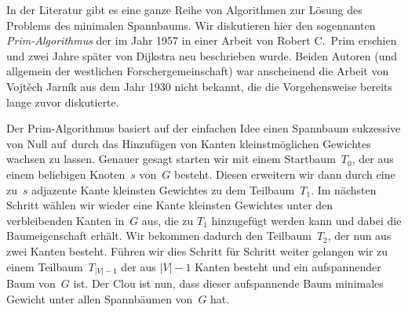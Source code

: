 \begin{bem} 
In der Literatur gibt es eine ganze Reihe von Algorithmen zur Lösung des Problems des minimalen Spannbaums.
Wir diskutieren hier den sogennanten \emph{Prim-Algorithmus} der im Jahr 1957 in einer Arbeit von Robert C.~Prim erschien und zwei Jahre später von Dijkstra neu beschrieben wurde.
Beiden Autoren (und allgemein der westlichen Forschergemeinschaft) war anscheinend die Arbeit von Vojt\v{e}ch Jarn\'{i}k aus dem Jahr 1930 nicht bekannt, die die Vorgehensweise bereits lange zuvor diskutierte.
\end{bem} 

\begin{bem}
Der Prim-Algorithmus basiert auf der einfachen Idee einen Spannbaum sukzessive \glqq von Null auf\grqq\ durch das Hinzufügen von Kanten kleinstmöglichen Gewichtes wachsen zu lassen.
Genauer gesagt starten wir mit einem Startbaum~$T_0$, der aus einem beliebigen Knoten~$s$ von~$G$ besteht.
Diesen erweitern wir dann durch eine zu~$s$ adjazente Kante kleinsten Gewichtes zu dem Teilbaum~$T_1$.
Im nächsten Schritt wählen wir wieder eine Kante kleinsten Gewichtes unter den verbleibenden Kanten in~$G$ aus, die zu $T_1$ hinzugefügt werden kann und dabei die Baumeigenschaft erhält.
Wir bekommen dadurch den Teilbaum~$T_2$, der nun aus zwei Kanten besteht.
Führen wir dies Schritt für Schritt weiter gelangen wir zu einem Teilbaum~$T_{|V|-1}$ der aus $|V|-1$ Kanten besteht und ein aufspannender Baum von~$G$ ist.
Der Clou ist nun, dass dieser aufspannende Baum minimales Gewicht unter allen Spannbäumen von~$G$ hat.
\end{bem} 



